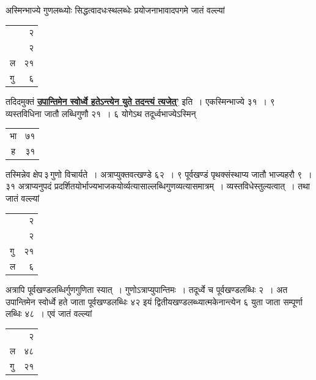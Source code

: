 \documentclass[11pt, openany]{book}
\begin{document}
{{\noindent अस्मिन्भाज्ये गुणलब्ध्योः सिद्धत्वादधःस्थलब्धेः प्रयोजनाभावादपगमे जातं वल्ल्यां

\vspace{-2mm}
\begin{table}[h!]
    \centering\s
    \begin{tabular}{lr}
     &२\\
&२\\
ल &२१ \\
 गु &६
    \end{tabular}
\end{table}
\vspace{-2mm}

\noindent तदिदमुक्तं \hyperref[51]{\textbf{उपान्तिमेन स्वोर्ध्वे हतेऽन्त्येन युते तदन्त्यं त्यजेत्'}} इति~। एकस्मिन्भाज्ये ३१~। ९ व्यस्तविधिना जातौ लब्धिगुणौ २१~। ६ योगेऽथ 
तदूर्ध्वभाज्येऽस्मिन्
\newpage
\begin{table}[h!]
    \centering\s
    \begin{tabular}{cl}
      भा &७१ \\
ह &३१
    \end{tabular}
\end{table}
\vspace{-2mm}

\noindent तस्मिन्नेव क्षेप\textendash \,३\textendash \,गुणो विचार्यते~। अत्राप्युक्तवत्खण्डे ६२~। ९
पूर्वखण्डं पृथक्संस्थाप्य जातौ भाज्यहरौ ९~। ३१ अत्राप्यनुपदं
प्रदर्शितयोर्भाज्यभाजकयोर्व्यत्यासाल्लब्धिगुणव्यत्यासमात्रम्~। व्यस्तविधेस्तुल्यत्वात्~। तथा जातं वल्ल्यां

\vspace{-2mm}
\begin{table}[h!]
    \centering\s
    \begin{tabular}{lr}
       & २\\
&२\\
गु& २१\\
ल &६
    \end{tabular}
\end{table}
\vspace{-2mm}

\noindent अत्रापि पूर्वखण्डलब्धिर्गुणगुणिता स्यात्~। गुणोऽत्राप्युपान्तिमः~। तदूर्ध्वे च पूर्वखण्डलब्धिः २~। अत उपान्तिमेन स्वोर्ध्वे हते जाता पूर्वखण्डलब्धिः ४२ इयं द्वितीयखण्डलब्ध्यात्मकेनान्त्येन ६ युता जाता सम्पूर्णा लब्धिः ४८~। एवं जातं वल्ल्यां 
\vspace{-2mm}

\begin{table}[h!]
       \centering\s
       \begin{tabular}{lr}
            &२\\
        ल&४८\\
        गु &२१
       \end{tabular}
\end{table}
\vspace{-2mm}

}}
\end{document}
